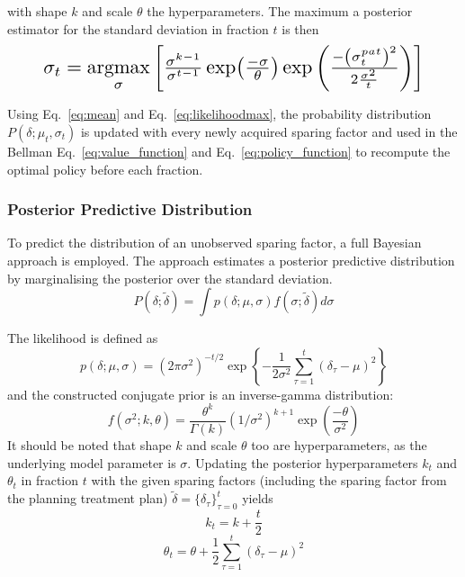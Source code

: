 \documentclass[\relativeRoot/ada.tex]{subfiles}
\begin{document}
with shape $k$ and scale $\theta$ the hyperparameters. The maximum a posterior estimator for the standard deviation in fraction $t$ is then
\begin{equation}\label{eq:likelihoodmax}
\resizebox{0.88\hsize}{!}{$
    \sigma_{t}=\underset{\sigma}{\operatorname{argmax}}\left[\frac{\sigma^{k-1}}{\sigma^{t-1}} \exp (\frac{-\sigma}{\theta}) \exp \left(\frac{-\left(\sigma_{t}^{p a t}\right)^{2}}{2 \frac{\sigma^{2}}{t}}\right)\right]
$}
\end{equation}

Using Eq.~\eqref{eq:mean} and Eq.~\eqref{eq:likelihoodmax}, the probability distribution $P(\delta ; \mu_t, \sigma_t)$ is updated with every newly acquired sparing factor and used in the Bellman Eq.~\eqref{eq:value_function} and Eq.~\eqref{eq:policy_function} to recompute the optimal policy before each fraction.

\subsubsection{Posterior Predictive Distribution}
To predict the distribution of an unobserved sparing factor, a full Bayesian approach is employed. The approach estimates a posterior predictive distribution by marginalising the posterior over the standard deviation.
\begin{equation*}
    P(\delta; \tilde{\delta}) = \int p(\delta;\mu, \sigma) f(\sigma; \tilde{\delta}) d \sigma
\end{equation*}

The likelihood is defined as
\begin{equation*}
    p\left(\delta; \mu, \sigma \right)=\left(2 \pi \sigma^{2}\right)^{-t / 2} \exp \left\{-\frac{1}{2 \sigma^{2}} \sum_{\tau=1}^{t}\left(\delta_{\tau}-\mu\right)^{2}\right\}
\end{equation*}
and the constructed conjugate prior is an inverse-gamma distribution:
\begin{equation}\label{eq:inv_gamma}
    f(\sigma^2;k,\theta) = \frac{\theta^k}{\Gamma(k)} (1/\sigma^2)^{k+1}\exp\left(\frac{-\theta}{\sigma^2}\right)
\end{equation}
It should be noted that shape $k$ and scale $\theta$ too are hyperparameters, as the underlying model parameter is $\sigma$. Updating the posterior hyperparameters $k_t$ and $\theta_t$ in fraction $t$ with the given sparing factors (including the sparing factor from the planning treatment plan) $\tilde{\delta} = \{\delta_\tau\}_{\tau=0}^{t}$ yields
\begin{equation}\label{eq:k_hyper}
    k_t = k +\frac{t}{2}
\end{equation}
\begin{equation}\label{eq:theta_hyper}
    \theta_t = \theta + \frac{1}{2} \sum_{\tau = 1}^t (\delta_{\tau} - \mu)^2    
\end{equation}
\end{document}
